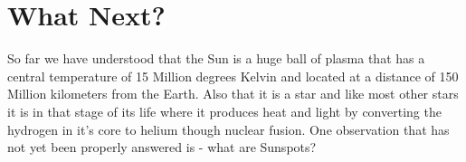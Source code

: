 \documentclass{../template/texnote}
\begin{document}
\section{What Next?}
So far we have understood that the Sun is a huge ball of plasma that has a central temperature of 15 Million degrees Kelvin and located at a distance of 150 Million kilometers from the Earth.
Also that it is a star and like most other stars it is in that stage of its life where it produces heat and light by converting the hydrogen in it's core to helium though nuclear fusion.
One observation that has not yet been properly answered is -  what are Sunspots?

    \printbibliography
\end{document}
